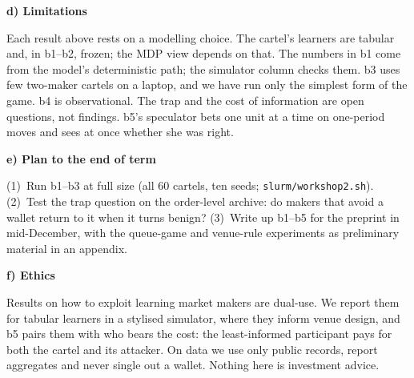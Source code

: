 \documentclass[10pt]{article}
\newcommand{\sect}[1]{\par\vspace{6pt}\noindent\textbf{#1}\par\vspace{1.5pt}\noindent}
\begin{document}
\sect{d) Limitations}
Each result above rests on a modelling choice. The cartel's learners are tabular and, in b1--b2, frozen; the MDP view depends on that. The numbers in b1 come from the model's deterministic path; the simulator column checks them. b3 uses few two-maker cartels on a laptop, and we have run only the simplest form of the game. b4 is observational. The trap and the cost of information are open questions, not findings. b5's speculator bets one unit at a time on one-period moves and sees at once whether she was right.

\sect{e) Plan to the end of term}
(1)~Run b1--b3 at full size (all 60 cartels, ten seeds; \texttt{slurm/workshop2.sh}). (2)~Test the trap question on the order-level archive: do makers that avoid a wallet return to it when it turns benign? (3)~Write up b1--b5 for the preprint in mid-December, with the queue-game and venue-rule experiments as preliminary material in an appendix.
\sect{f) Ethics}
Results on how to exploit learning market makers are dual-use. We report them for tabular learners in a stylised simulator, where they inform venue design, and b5 pairs them with who bears the cost: the least-informed participant pays for both the cartel and its attacker. On data we use only public records, report aggregates and never single out a wallet. Nothing here is investment advice.
\end{document}
